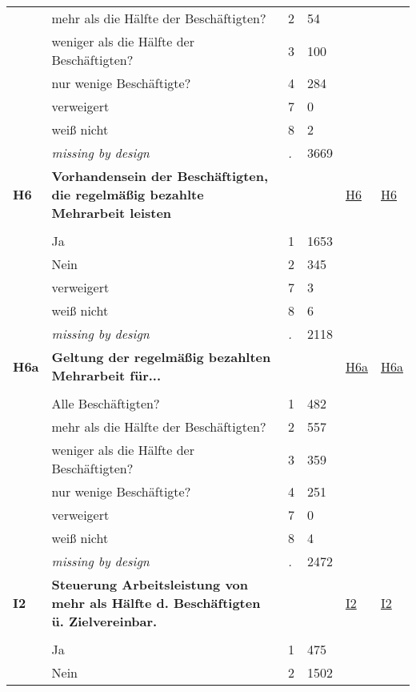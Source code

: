 \begin{longtable}{| L{2.45cm} | L{6cm} | C{1.5cm} | R{1cm} | C{2.25cm} | C{2.25cm} |}
   & mehr als die Hälfte der Beschäftigten? & 2 & 54 &  &  \\ 
   & weniger als die Hälfte der Beschäftigten? & 3 & 100 &  &  \\ 
   & nur wenige Beschäftigte? & 4 & 284 &  &  \\ 
   & verweigert & 7 & 0 &  &  \\ 
   & weiß nicht & 8 & 2 &  &  \\ 
   & \textit{missing by design} & \textit{.} & 3669 &  &  \\ 
   \midrule
\textbf{H6}\label{var:H6} & \textbf{Vorhandensein der Beschäftigten, die regelmäßig bezahlte Mehrarbeit leisten} &  &  & \hyperref[H6]{H6} & \hyperref[var:suf:H6]{H6} \\ 
   &  &  &  &  &  \\ 
   & Ja & 1 & 1653 &  &  \\ 
   & Nein & 2 & 345 &  &  \\ 
   & verweigert & 7 & 3 &  &  \\ 
   & weiß nicht & 8 & 6 &  &  \\ 
   & \textit{missing by design} & \textit{.} & 2118 &  &  \\ 
   \midrule
\textbf{H6a}\label{var:H6a} & \textbf{Geltung der regelmäßig bezahlten Mehrarbeit für...} &  &  & \hyperref[H6a]{H6a} & \hyperref[var:suf:H6a]{H6a} \\ 
   &  &  &  &  &  \\ 
   & Alle Beschäftigten? & 1 & 482 &  &  \\ 
   & mehr als die Hälfte der Beschäftigten? & 2 & 557 &  &  \\ 
   & weniger als die Hälfte der Beschäftigten? & 3 & 359 &  &  \\ 
   & nur wenige Beschäftigte? & 4 & 251 &  &  \\ 
   & verweigert & 7 & 0 &  &  \\ 
   & weiß nicht & 8 & 4 &  &  \\ 
   & \textit{missing by design} & \textit{.} & 2472 &  &  \\ 
   \midrule
\textbf{I2}\label{var:I2} & \textbf{Steuerung Arbeitsleistung von mehr als Hälfte d. Beschäftigten ü. Zielvereinbar.} &  &  & \hyperref[I2]{I2} & \hyperref[var:suf:I2]{I2} \\ 
   &  &  &  &  &  \\ 
   & Ja & 1 & 475 &  &  \\ 
   & Nein & 2 & 1502 &  &  \\ 

\end{longtable}
